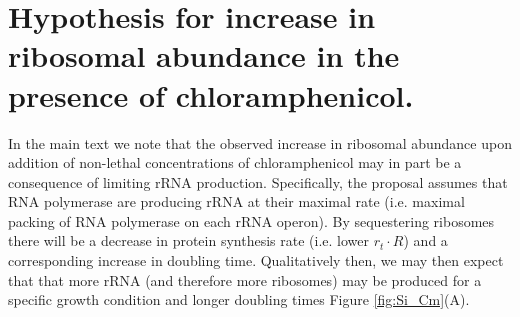 \begin{figure}
    \begin{fullwidth}
\end{fullwidth}
\end{figure}


\section{Hypothesis for increase in ribosomal abundance in the presence of chloramphenicol.}

In the main text we note that the observed increase in ribosomal abundance  upon
addition of non-lethal concentrations of chloramphenicol may in part  be a
consequence of limiting rRNA production. Specifically, the proposal assumes that
RNA polymerase are producing rRNA at their maximal rate (i.e. maximal packing of
RNA polymerase on each rRNA operon). By sequestering ribosomes there will be a
decrease in protein synthesis rate (i.e. lower $r_t \cdot R$) and a
corresponding increase in doubling time. Qualitatively then, we may then expect
that that more rRNA (and therefore more ribosomes) may be produced for a
specific growth condition and longer doubling times  Figure
\ref{fig:Si_Cm}(A).

